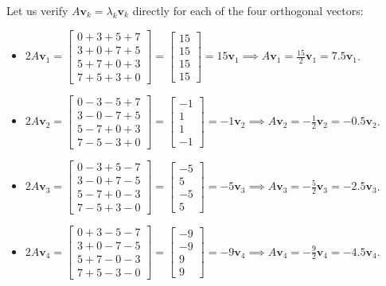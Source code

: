 \documentclass[11pt, letterpaper]{article}
\theoremstyle{definition}
\theoremstyle{remark}
\begin{document}
\begin{enumerate}[leftmargin=2em]
\[    \]
    Let us verify $A\mathbf{v}_k = \lambda_k \mathbf{v}_k$ directly for each of the four orthogonal vectors:
    \begin{itemize}
        \item $2A\mathbf{v}_1 = \begin{bmatrix} 0+3+5+7 \\ 3+0+7+5 \\ 5+7+0+3 \\ 7+5+3+0 \end{bmatrix} = \begin{bmatrix} 15 \\ 15 \\ 15 \\ 15 \end{bmatrix} = 15\mathbf{v}_1 \implies A\mathbf{v}_1 = \frac{15}{2}\mathbf{v}_1 = 7.5\mathbf{v}_1$.
        \item $2A\mathbf{v}_2 = \begin{bmatrix} 0-3-5+7 \\ 3-0-7+5 \\ 5-7+0+3 \\ 7-5-3+0 \end{bmatrix} = \begin{bmatrix} -1 \\ 1 \\ 1 \\ -1 \end{bmatrix} = -1\mathbf{v}_2 \implies A\mathbf{v}_2 = -\frac{1}{2}\mathbf{v}_2 = -0.5\mathbf{v}_2$.
        \item $2A\mathbf{v}_3 = \begin{bmatrix} 0-3+5-7 \\ 3-0+7-5 \\ 5-7+0-3 \\ 7-5+3-0 \end{bmatrix} = \begin{bmatrix} -5 \\ 5 \\ -5 \\ 5 \end{bmatrix} = -5\mathbf{v}_3 \implies A\mathbf{v}_3 = -\frac{5}{2}\mathbf{v}_3 = -2.5\mathbf{v}_3$.
        \item $2A\mathbf{v}_4 = \begin{bmatrix} 0+3-5-7 \\ 3+0-7-5 \\ 5+7-0-3 \\ 7+5-3-0 \end{bmatrix} = \begin{bmatrix} -9 \\ -9 \\ 9 \\ 9 \end{bmatrix} = -9\mathbf{v}_4 \implies A\mathbf{v}_4 = -\frac{9}{2}\mathbf{v}_4 = -4.5\mathbf{v}_4$.

\end{itemize}
\end{enumerate}
\end{document}

